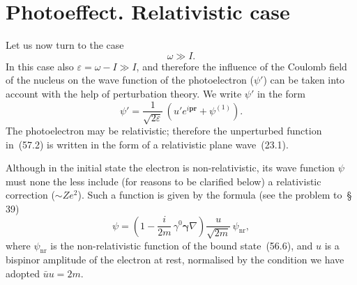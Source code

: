 \section{Photoeffect. Relativistic case}

Let us now turn to the case
\begin{equation}
\omega \gg I.
\tag{57.1}
\end{equation}
In this case also $\varepsilon = \omega - I \gg I$, and therefore the influence of the Coulomb field of the nucleus on the wave function of the photoelectron ($\psi'$) can be taken into account with the help of perturbation theory. We write $\psi'$ in the form
\begin{equation}
\psi' = \frac{1}{\sqrt{2\varepsilon}}\,(u'e^{i\mathbf{p}\mathbf{r}} + \psi^{(1)}).
\tag{57.2}
\end{equation}
The photoelectron may be relativistic; therefore the unperturbed function in~(57.2) is written in the form of a relativistic plane wave~(23.1).

Although in the initial state the electron is non-relativistic, its wave function $\psi$ must none the less include (for reasons to be clarified below) a relativistic correction ($\sim Ze^2$). Such a function is given by the formula (see the problem to~\S\,39)
\begin{equation}
\psi = \left(1 - \frac{i}{2m}\,\gamma^0\boldsymbol{\gamma}\nabla\right)\frac{u}{\sqrt{2m}}\,\psi_\mathrm{nr},
\tag{57.3}
\end{equation}
where $\psi_\mathrm{nr}$ is the non-relativistic function of the bound state~(56.6), and $u$ is a bispinor amplitude of the electron at rest, normalised by the condition we have adopted $\bar{u}u = 2m$.

